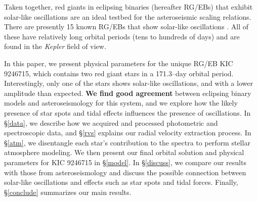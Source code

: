 Taken together, red giants in eclipsing binaries (hereafter RG/EBs) that exhibit solar-like oscillations are an ideal testbed for the asteroseismic scaling relations. There are presently 15 known RG/EBs that show solar-like oscillations \citep{gau13,gau14}. All of these have relatively long orbital periods (tens to hundreds of days) and are found in the \emph{Kepler} field of view. 

In this paper, we present physical parameters for the unique RG/EB KIC 9246715, which contains two red giant stars in a 171.3--day orbital period. Interestingly, only one of the stars shows solar-like oscillations, and with a lower amplitude than expected. \textbf{We find good agreement} between eclipsing binary models and asteroseismology for this system, and we explore how the likely presence of star spots and tidal effects influences the presence of oscillations. In \S \ref{data}, we describe how we acquired and processed photometric and spectroscopic data, and \S \ref{rvs} explains our radial velocity extraction process. In \S \ref{atm}, we disentangle each star's contribution to the spectra to perform stellar atmosphere modeling. We then present our final orbital solution and physical parameters for KIC 9246715 in \S \ref{model}. In \S \ref{discuss}, we compare our results with those from asteroseismology \citep{gau14} and discuss the possible connection between solar-like oscillations and effects such as star spots and tidal forces. Finally, \S \ref{conclude} summarizes our main results.
